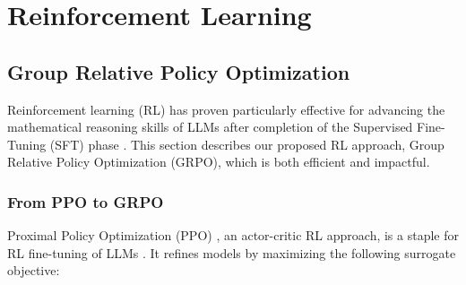 \section{Reinforcement Learning}

\subsection{Group Relative Policy Optimization} Reinforcement learning (RL) has proven particularly effective for advancing the mathematical reasoning skills of LLMs after completion of the Supervised Fine-Tuning (SFT) phase \citep{wang2023math,wizardmath}. This section describes our proposed RL approach, Group Relative Policy Optimization (GRPO), which is both efficient and impactful.

\subsubsection{From PPO to GRPO} Proximal Policy Optimization (PPO) \citep{schulman2017proximal}, an actor-critic RL approach, is a staple for RL fine-tuning of LLMs \citep{ouyang2022training}. It refines models by maximizing the following surrogate objective:

